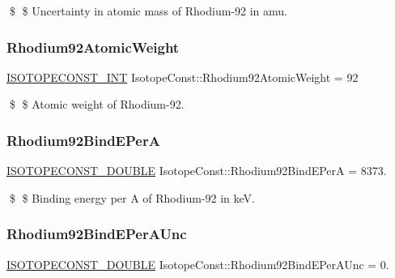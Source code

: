 \$ \$ Uncertainty in atomic mass of Rhodium-\/92 in amu. \mbox{\label{group___isotope_const-_rhodium-_rh92_gad401e82266b1f95d2cf09016b86578e8}} 
\subsubsection{\texorpdfstring{Rhodium92\+Atomic\+Weight}{Rhodium92AtomicWeight}}
{\footnotesize\ttfamily \mbox{\hyperlink{group___isotope_const-_macros_ga5f18360b3e99483a35c32d789e62621c}{I\+S\+O\+T\+O\+P\+E\+C\+O\+N\+S\+T\+\_\+\+I\+NT}} Isotope\+Const\+::\+Rhodium92\+Atomic\+Weight = 92}

\$ \$ Atomic weight of Rhodium-\/92. \mbox{\label{group___isotope_const-_rhodium-_rh92_gafd7906ce477bdb48907193cb864a94a0}} 
\subsubsection{\texorpdfstring{Rhodium92\+Bind\+E\+PerA}{Rhodium92BindEPerA}}
{\footnotesize\ttfamily \mbox{\hyperlink{group___isotope_const-_macros_ga8f45a7272ce02c0b4c65c44636ed719a}{I\+S\+O\+T\+O\+P\+E\+C\+O\+N\+S\+T\+\_\+\+D\+O\+U\+B\+LE}} Isotope\+Const\+::\+Rhodium92\+Bind\+E\+PerA = 8373.}

\$ \$ Binding energy per A of Rhodium-\/92 in keV. \mbox{\label{group___isotope_const-_rhodium-_rh92_ga23522be2d02d6cd8e070b522576d85f5}} 
\subsubsection{\texorpdfstring{Rhodium92\+Bind\+E\+Per\+A\+Unc}{Rhodium92BindEPerAUnc}}
{\footnotesize\ttfamily \mbox{\hyperlink{group___isotope_const-_macros_ga8f45a7272ce02c0b4c65c44636ed719a}{I\+S\+O\+T\+O\+P\+E\+C\+O\+N\+S\+T\+\_\+\+D\+O\+U\+B\+LE}} Isotope\+Const\+::\+Rhodium92\+Bind\+E\+Per\+A\+Unc = 0.}

